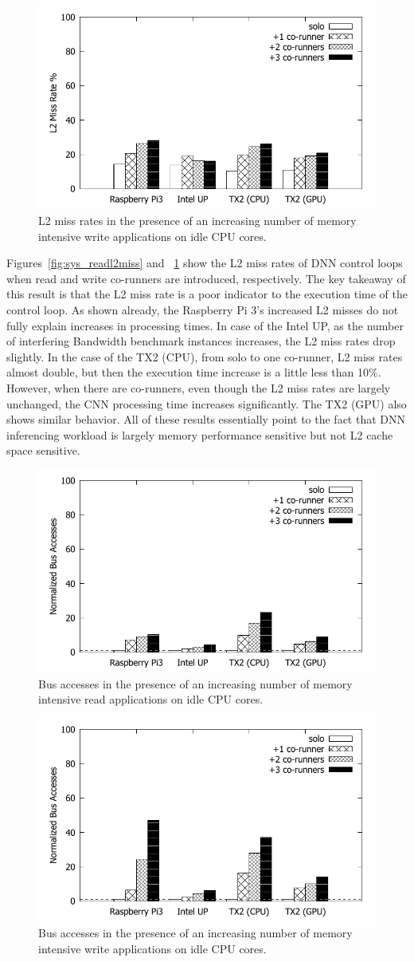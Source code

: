 \begin{figure}[h]
  \centering
  \includegraphics[width=.45\textwidth]{figs/compare_l2missrate}
  \caption{L2 miss rates in the presence of an increasing number of 
			memory intensive write applications on idle CPU cores.}
  \label{fig:sys_l2miss}
\end{figure}

Figures~\ref{fig:sys_readl2miss} and ~\ref{fig:sys_l2miss} show
the L2 miss rates of DNN control loops when read and write co-runners
are introduced, respectively. The key takeaway of this result is that the 
L2 miss rate is a
poor indicator to the execution time of the control loop. As shown
already, the Raspberry Pi 3's increased L2 misses do not fully explain
increases in processing times. In case of the Intel UP, as the number of
interfering Bandwidth benchmark instances increases, the L2 miss rates
drop slightly. In the case of the TX2 (CPU), from solo to one co-runner,
L2 miss rates almost double, but then the execution time
increase is a little less than 10\%. However, when there are
co-runners, even though the L2 miss rates are largely unchanged, the
CNN processing time increases significantly. The TX2 (GPU) also shows
similar behavior. All of these results essentially point to the fact
that DNN inferencing workload is largely memory performance sensitive
but not L2 cache space sensitive. 

\begin{figure}[h]
  \centering
  \includegraphics[width=.45\textwidth]{figs/compare_readbus}
  \caption{Bus accesses in the presence of an increasing number of 
			memory intensive read applications on idle CPU cores.}
  \label{fig:sys_readbus}
\end{figure}

\begin{figure}[h]
  \centering
  \includegraphics[width=.45\textwidth]{figs/compare_writebus}
  \caption{Bus accesses in the presence of an increasing number of 
			memory intensive write applications on idle CPU cores.}
  \label{fig:sys_writebus}
\end{figure}

